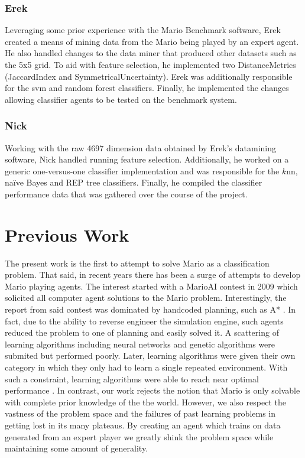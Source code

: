 \documentclass[]{article}   %
\begin{document}
\subsubsection{Erek}
Leveraging some prior experience with the Mario Benchmark software, Erek created a means of mining data from the Mario being played by an expert agent. He also handled changes to the data miner that produced other datasets such as the 5x5 grid. To aid with feature selection, he implemented two DistanceMetrics (JaccardIndex and SymmetricalUncertainty). Erek was additionally responsible for the svm and random forest classifiers. Finally, he implemented the changes allowing classifier agents to be tested on the benchmark system.

\subsubsection{Nick}
Working with the raw 4697 dimension data obtained by Erek's datamining software, Nick handled running feature selection. Additionally, he worked on a generic one-versus-one classifier implementation and was responsible for the $k$nn, na\"{i}ve Bayes and REP tree classifiers. Finally, he compiled the classifier performance data that was gathered over the course of the project.

\section{Previous Work}
\label{sec:prevwork}
The present work is the first to attempt to solve Mario as a classification problem.  That said, in recent years there has been a surge of attempts to develop Mario playing agents.  The interest started with a MarioAI contest in 2009 which solicited all computer agent solutions to the Mario problem.  Interestingly, the report from said contest was dominated by handcoded planning, such as A* \cite{marioaicompetiton}.  In fact, due to the ability to reverse engineer the simulation engine, such agents reduced the problem to one of planning and easily solved it.  A scattering of learning algorithms including neural networks and genetic algorithms were submited but performed poorly.  Later, learning algorithms were given their own category in which they only had to learn a single repeated environment. With such a constraint, learning algorithms were able to reach near optimal performance \cite{speed}. In contrast, our work rejects the notion that Mario is only solvable with complete prior knowledge of the the world.  However, we also respect the vastness of the problem space and the failures of past learning problems in getting lost in its many plateaus.  By creating an agent which trains on data generated from an expert player we greatly shink the problem space while maintaining some amount of generality.  
\end{document}
